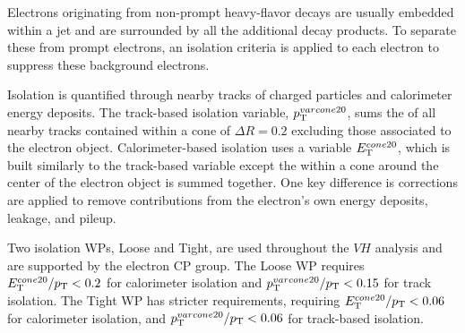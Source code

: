 Electrons originating from non-prompt heavy-flavor decays are usually embedded within a jet and are surrounded by all the additional decay products. To separate these from prompt electrons, an isolation criteria is applied to each electron to suppress these background electrons.

Isolation is quantified through nearby tracks of charged particles and calorimeter energy deposits. The track-based isolation variable, $p_{\mathrm{T}}^{varcone20}$, sums the \pt{} of all nearby tracks contained within a cone of $\Delta R = 0.2$ excluding those associated to the electron object. Calorimeter-based isolation uses a variable $E_{\mathrm{T}}^{cone20}$, which is built similarly to the track-based variable except the \et{} within a cone around the center of the electron object is summed together. One key difference is corrections are applied to remove contributions from the electron's own energy deposits, leakage, and pileup.

Two isolation WPs, Loose and Tight, are used throughout the $VH$ analysis and are supported by the electron CP group. The Loose WP requires $E_{\mathrm{T}}^{cone20}/p_{\mathrm{T}} < 0.2$ for calorimeter isolation and $p_{\mathrm{T}}^{varcone20}/p_{\mathrm{T}} < 0.15$ for track isolation. The Tight WP has stricter requirements, requiring $E_{\mathrm{T}}^{cone20}/p_{\mathrm{T}} < 0.06$ for calorimeter isolation, and $p_{\mathrm{T}}^{varcone20}/p_{\mathrm{T}} < 0.06$ for track-based isolation. 